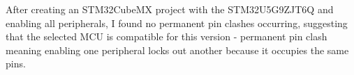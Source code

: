 After creating an STM32CubeMX project with the STM32U5G9ZJT6Q and enabling all peripherals, I found no permanent pin clashes occurring, suggesting that the selected MCU is compatible for this version - permanent pin clash meaning enabling one peripheral locks out another because it occupies the same pins.